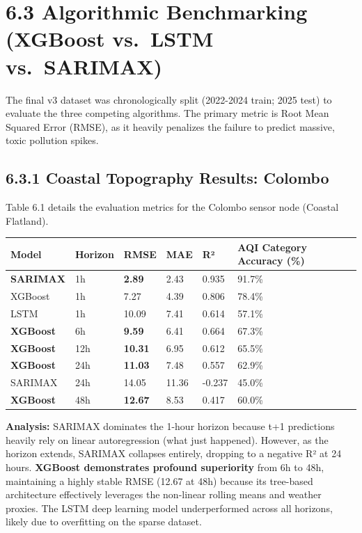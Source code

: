 \section{6.3 Algorithmic Benchmarking (XGBoost vs.~LSTM
vs.~SARIMAX)}\label{algorithmic-benchmarking-xgboost-vs.-lstm-vs.-sarimax}

The final v3 dataset was chronologically split (2022-2024 train; 2025
test) to evaluate the three competing algorithms. The primary metric is
Root Mean Squared Error (RMSE), as it heavily penalizes the failure to
predict massive, toxic pollution spikes.

\subsection{6.3.1 Coastal Topography Results:
Colombo}\label{coastal-topography-results-colombo}

Table 6.1 details the evaluation metrics for the Colombo sensor node
(Coastal Flatland).

{\def\LTcaptype{none} %
\begin{longtable}[]{@{}llllll@{}}
\toprule\noalign{}
Model & Horizon & RMSE & MAE & R² & AQI Category Accuracy (\%) \\
\midrule\noalign{}
\endhead
\bottomrule\noalign{}
\endlastfoot
\textbf{SARIMAX} & 1h & \textbf{2.89} & 2.43 & 0.935 & 91.7\% \\
XGBoost & 1h & 7.27 & 4.39 & 0.806 & 78.4\% \\
LSTM & 1h & 10.09 & 7.41 & 0.614 & 57.1\% \\
\textbf{XGBoost} & 6h & \textbf{9.59} & 6.41 & 0.664 & 67.3\% \\
\textbf{XGBoost} & 12h & \textbf{10.31} & 6.95 & 0.612 & 65.5\% \\
\textbf{XGBoost} & 24h & \textbf{11.03} & 7.48 & 0.557 & 62.9\% \\
SARIMAX & 24h & 14.05 & 11.36 & -0.237 & 45.0\% \\
\textbf{XGBoost} & 48h & \textbf{12.67} & 8.53 & 0.417 & 60.0\% \\
\end{longtable}
}

\textbf{Analysis:} SARIMAX dominates the 1-hour horizon because t+1
predictions heavily rely on linear autoregression (what just happened).
However, as the horizon extends, SARIMAX collapses entirely, dropping to
a negative R² at 24 hours. \textbf{XGBoost demonstrates profound
superiority} from 6h to 48h, maintaining a highly stable RMSE (12.67 at
48h) because its tree-based architecture effectively leverages the
non-linear rolling means and weather proxies. The LSTM deep learning
model underperformed across all horizons, likely due to overfitting on
the sparse dataset.

